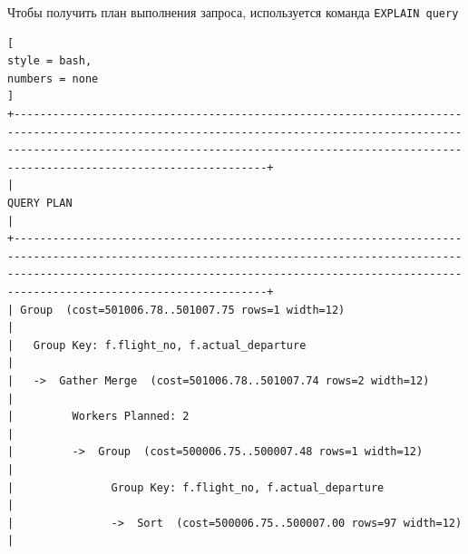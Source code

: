 \documentclass[%
	11pt,
	a4paper,
	utf8,
		]{article}
\begin{document}
Чтобы получить план выполнения запроса, используется команда \verb|EXPLAIN query|
\begin{lstlisting}[
style = bash,
numbers = none
]
+---------------------------------------------------------------------------------------------------------------------------------------------------------------------------------------------------------------------------------------------------------+
|                                                                                                                       QUERY PLAN                                                                                                                        |
+---------------------------------------------------------------------------------------------------------------------------------------------------------------------------------------------------------------------------------------------------------+
| Group  (cost=501006.78..501007.75 rows=1 width=12)                                                                                                                                                                                                      |
|   Group Key: f.flight_no, f.actual_departure                                                                                                                                                                                                            |
|   ->  Gather Merge  (cost=501006.78..501007.74 rows=2 width=12)                                                                                                                                                                                         |
|         Workers Planned: 2                                                                                                                                                                                                                              |
|         ->  Group  (cost=500006.75..500007.48 rows=1 width=12)                                                                                                                                                                                          |
|               Group Key: f.flight_no, f.actual_departure                                                                                                                                                                                                |
|               ->  Sort  (cost=500006.75..500007.00 rows=97 width=12)                                                                                                                                                                                    |

\end{lstlisting}
\end{document}
